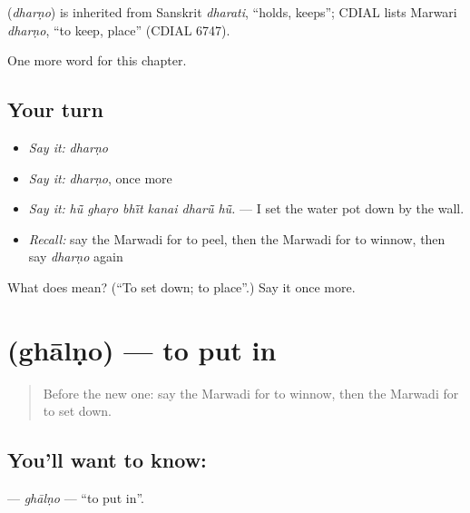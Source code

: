\begin{cousinweb}
\textbf{} (\emph{dharṇo}) is inherited from Sanskrit \emph{dharati}, \textquotedblleft{}holds, keeps\textquotedblright{}; CDIAL lists Marwari \emph{dharṇo}, \textquotedblleft{}to keep, place\textquotedblright{} (CDIAL 6747).
\end{cousinweb}

\begin{grammarlens}[title={What you've built}]
One more word for this chapter.
\end{grammarlens}

\subsection*{Your turn}
\begin{itemize}
\raggedright
  \item \emph{Say it:} \emph{dharṇo}
  \item \emph{Say it:} \emph{dharṇo}, once more
  \item \emph{Say it:} \emph{hū̃ ghaṛo bhī̃t kanai dharū̃ hū̃.} — I set the water pot down by the wall.
  \item \emph{Recall:} say the Marwadi for to peel, then the Marwadi for to winnow, then say \emph{dharṇo} again
\end{itemize}

\begin{tcolorbox}[breakable,colback=teal!4,colframe=teal!35!black,title={Before you move on}]
What does  mean? (\textquotedblleft{}To set down; to place\textquotedblright{}.) Say it once more.
\end{tcolorbox}
\section[\texorpdfstring{\mw{घालणो} (ghālṇo)}{घालणो (ghālṇo)}]{ (ghālṇo) — to put in}

\label{lesson:MW-C180-ghalno}



\begin{quote}
Before the new one: say the Marwadi for to winnow, then the Marwadi for to set down.
\end{quote}

\subsection*{You'll want to know: }
\textbf{} — \emph{ghālṇo} — \textquotedblleft{}to put in\textquotedblright{}.

